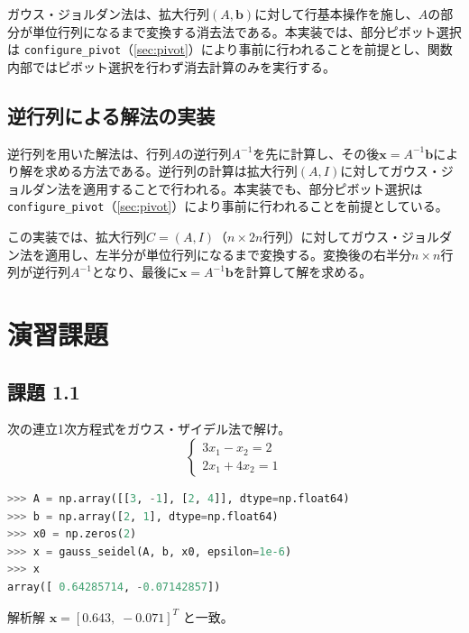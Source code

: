 \documentclass[12pt,a4paper]{ltjsreport}
\begin{document}
ガウス・ジョルダン法は、拡大行列$(A, \boldsymbol{b})$に対して行基本操作を施し、$A$の部分が単位行列になるまで変換する消去法である。本実装では、部分ピボット選択は \texttt{configure\_pivot}（\ref{sec:pivot}）により事前に行われることを前提とし、関数内部ではピボット選択を行わず消去計算のみを実行する。



\newpage
\subsection{逆行列による解法の実装}

逆行列を用いた解法は、行列$A$の逆行列$A^{-1}$を先に計算し、その後$\boldsymbol{x} = A^{-1}\boldsymbol{b}$により解を求める方法である。逆行列の計算は拡大行列$(A, I)$に対してガウス・ジョルダン法を適用することで行われる。本実装でも、部分ピボット選択は \texttt{configure\_pivot}（\ref{sec:pivot}）により事前に行われることを前提としている。



この実装では、拡大行列$C = (A, I)$（$n \times 2n$行列）に対してガウス・ジョルダン法を適用し、左半分が単位行列になるまで変換する。変換後の右半分$n \times n$行列が逆行列$A^{-1}$となり、最後に$\boldsymbol{x} = A^{-1}\boldsymbol{b}$を計算して解を求める。

\newpage

\section{演習課題}

\subsection*{課題 1.1}
次の連立1次方程式をガウス・ザイデル法で解け。
\begin{equation}
\begin{cases}
3x_1 - x_2 = 2 \\
2x_1 + 4x_2 = 1
\end{cases}
\end{equation}

\bigskip
\begin{lstlisting}[language=Python, numbers=none]
>>> A = np.array([[3, -1], [2, 4]], dtype=np.float64)
>>> b = np.array([2, 1], dtype=np.float64)
>>> x0 = np.zeros(2)
>>> x = gauss_seidel(A, b, x0, epsilon=1e-6)
>>> x
array([ 0.64285714, -0.07142857])
\end{lstlisting}
解析解 $\boldsymbol{x} = [0.643,\; -0.071]^T$ と一致。
\end{document}
